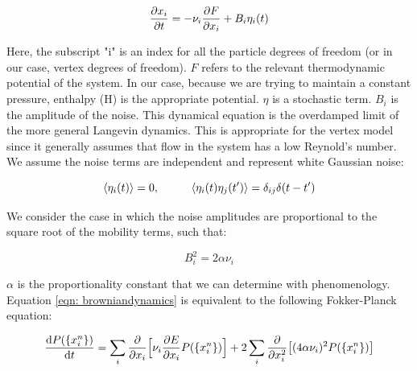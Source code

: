 \documentclass[12pt]{article}
\begin{document}
\begin{center}
\begin{equation}
\label{eqn: browniandynamics}
\pdv{x_i}{t} = -\nu_i \pdv{F}{x_i} + B_i \eta_i(t)
\end{equation}
\end{center}
Here, the subscript "i" is an index for all the particle degrees of freedom (or in our case, vertex degrees of freedom). $F$ refers to the relevant thermodynamic potential of the system. In our case, because we are trying to maintain a constant pressure, enthalpy (H) is the appropriate potential. $\eta$ is a stochastic term. $B_i$ is the amplitude of the noise. This dynamical equation is the overdamped limit of the more general Langevin dynamics. This is appropriate for the vertex model since it generally assumes that flow in the system has a low Reynold's number. \\
We assume the noise terms are independent and represent white Gaussian noise:
\begin{center}
\begin{equation}
\label{eqn: noiseconditions}
\expval{\eta_i(t)} = 0, \hspace{1cm}
\expval{\eta_i(t) \eta_j(t')} = \delta_{ij} \delta(t-t')
\end{equation}
\end{center}
We consider the case in which the noise amplitudes are proportional to the square root of the mobility terms, such that:
\begin{center}
\begin{equation}
B_i^2 = 2 \alpha \nu_i
\end{equation}
\end{center}
$\alpha$ is the proportionality constant that we can determine with phenomenology. Equation \ref{eqn: browniandynamics} is equivalent to the following Fokker-Planck equation:
\begin{center}
\begin{equation}
\label{eqn: fokkerplanck}
\dv{P(\{x_i^n\})}{t} = \sum\limits_i \pdv{x_i} \Big[\nu_i \pdv{E}{x_i}P(\{x_i^n\}  )\Big] + 2 \sum\limits_i \pdv{x_i^2} \big[(4 \alpha \nu_i)^2 P(\{x_i^n\})\big]
\end{equation}
\end{center}
\end{document}
